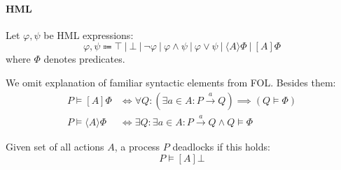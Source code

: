 \documentclass[99-notes-packed.tex]{subfiles}
\begin{document}
\paragraph*{HML}
Let $\varphi, \psi$ be HML expressions: 
\begin{equation*}
    \varphi, \psi \Coloneqq 
    \top\ |\ \bot\ |\ \neg \varphi\ |\ \varphi \wedge \psi\ |\ 
    \varphi \vee \psi \ |\ \langle A\rangle \Phi \ |\ [A] \Phi
\end{equation*}
where $\Phi$ denotes predicates. 

We omit explanation of familiar syntactic elements from FOL. Besides them: 
\begin{align*}
    P \models [A]\Phi &\iff 
    \forall Q: (\exists a \in A: P \xrightarrow{a} Q) \implies (Q \models \Phi) \\
    P \models \langle A\rangle \Phi &\iff 
    \exists Q: \exists a \in A: P \xrightarrow{a} Q \wedge Q \models \Phi
\end{align*}

\begin{example}
    Given set of all actions $A$, a process $P$ deadlocks if this holds:  
    \begin{equation*}
        P \models [A]\bot
    \end{equation*}
\end{example}
\end{document}
